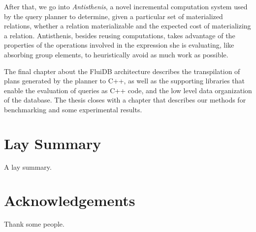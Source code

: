 \begin{precontent}
After that, we go into \emph{Antisthenis}, a novel incremental
computation system used by the query planner to determine, given a
particular set of materialized relations, whether a relation
materializable and the expected cost of materializing a
relation. Antisthenis, besides reusing computations, takes advantage
of the properties of the operations involved in the expression she is
evaluating, like absorbing group elements, to heuristically avoid as
much work as possible.

The final chapter about the FluiDB architecture describes the
transpilation of plans generated by the planner to C++, as well as the
supporting libraries that enable the evaluation of queries as C++
code, and the low level data organization of the database. The thesis
closes with a chapter that describes our methods for benchmarking and
some experimental results.


\chapter{Lay Summary}%
A lay summary.

\chapter{Acknowledgements}%
Thank some people.






\end{precontent}


\tableofcontents

\cleardoublepage
{}
{}
\listoffigures

\cleardoublepage%
